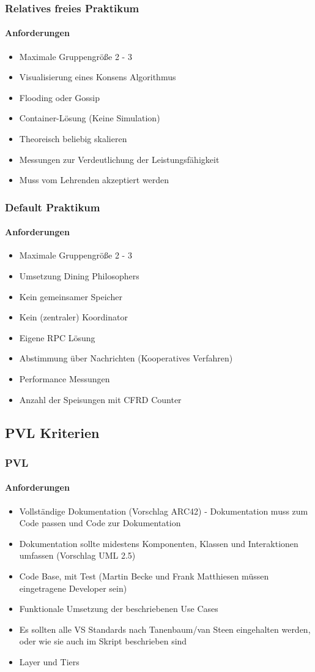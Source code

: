 \begin{frame}
  \frametitle{Relatives freies Praktikum}
  \framesubtitle{Anforderungen}
  \begin{itemize}
    \item Maximale Gruppengröße 2 - 3
    \item Visualisierung eines Konsens Algorithmus
    \item Flooding oder Gossip
    \item Container-Lösung (Keine Simulation)
    \item Theoreisch beliebig skalieren
    \item Messungen zur Verdeutlichung der Leistungsfähigkeit
    \item Muss vom Lehrenden akzeptiert werden
  \end{itemize}
\end{frame}

\begin{frame}
  \frametitle{Default Praktikum}
  \framesubtitle{Anforderungen}
  \begin{itemize}
    \item Maximale Gruppengröße 2 - 3
    \item Umsetzung Dining Philosophers
    \item Kein gemeinsamer Speicher
    \item Kein (zentraler) Koordinator
    \item Eigene RPC Lösung
    \item Abstimmung über Nachrichten (Kooperatives Verfahren)
    \item Performance Messungen
    \item Anzahl der Speisungen mit CFRD Counter
  \end{itemize}
\end{frame}
\subsection{PVL Kriterien}
\begin{frame}
  \frametitle{PVL}
  \framesubtitle{Anforderungen}
  \begin{itemize}
    \item Vollständige Dokumentation (Vorschlag ARC42) - Dokumentation muss zum Code passen und Code zur Dokumentation
    \item Dokumentation sollte midestens Komponenten, Klassen und Interaktionen umfassen (Vorschlag UML 2.5)
    \item Code Base, mit Test (Martin Becke und Frank Matthiesen müssen eingetragene Developer sein)
    \item Funktionale Umsetzung der beschriebenen Use Cases 
    \item Es sollten alle VS Standards nach Tanenbaum/van Steen eingehalten werden, oder wie sie auch im Skript beschrieben sind
    \item Layer und Tiers
  \end{itemize}

\end{frame}